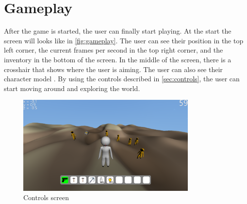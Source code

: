 \section{Gameplay}\label{sec:gameplay}
After the game is started, the user can finally start playing.
At the start the screen will looks like in \autoref{fig:gameplay}.
The user can see their position in the top left corner, the current frames per second in the top right corner, and the inventory in the bottom of the screen.
In the middle of the screen, there is a crosshair that shows where the user is aiming.
The user can also see their character model .
By using the controls described in \autoref{sec:controls}, the user can start moving around and exploring the world.


\begin{figure}[h]
    \centering
    \includegraphics[width=0.8\textwidth]{chapters/user_manual/resources/gameplay.png}
    \caption{Controls screen}
    \label{fig:gameplay}
\end{figure}